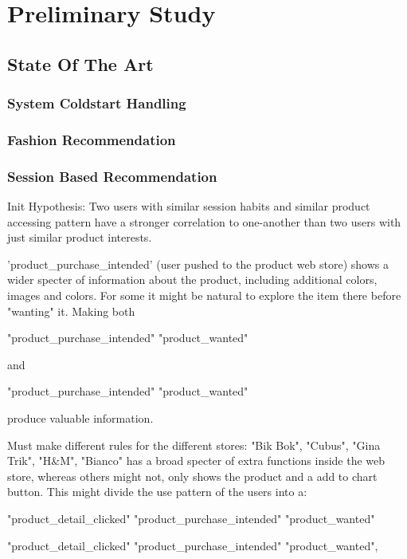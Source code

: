 
\chapter{Preliminary Study}
\minitoc

\clearpage

\section{State Of The Art}
\subsection{System Coldstart Handling}
\subsection{Fashion Recommendation}
\subsection{Session Based Recommendation}
Init Hypothesis:
Two users with similar session habits and similar product accessing pattern have a stronger correlation to one-another than two users with just similar product interests.


'product\_purchase\_intended' (user pushed to the product web store) shows a wider specter of information about the product, including additional colors, images and colors.
For some it might be natural to explore the item there before "wanting" it. Making both

"product\_purchase\_intended" \Rightarrow "product\_wanted"

and

"product\_purchase\_intended"
\notimplies
"product\_wanted"

produce valuable information.

Must make different rules for the different stores:
"Bik Bok", "Cubus", "Gina Trik", "H\&M", "Bianco" has a broad specter of extra functions inside the web store, whereas others might not, only shows the product and a add to chart button.
This might divide the use pattern of the users into a:

"product\_detail\_clicked" \Rightarrow "product\_purchase\_intended" \Rightarrow "product\_wanted"

"product\_detail\_clicked" \Rightarrow "product\_purchase\_intended"
\notimplies
"product\_wanted",

